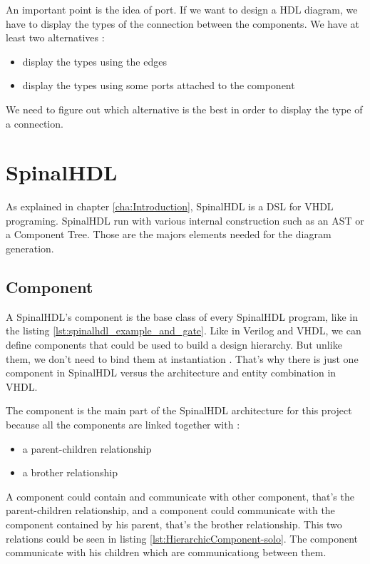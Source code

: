 An important point is the idea of port. If we want to design a HDL diagram, we
have to display the types of the connection between the components. We have at
least two alternatives :
\begin{itemize}
 \item display the types using the edges
 \item display the types using some ports attached to the component
\end{itemize}

We need to figure out which alternative is the best in order to display the type
of a connection.

\section{SpinalHDL}
\label{sec:SpinalHDL}

As explained in chapter \ref{cha:Introduction}, SpinalHDL is a DSL for VHDL
programing. SpinalHDL run with various internal construction such as an AST or
a Component Tree. Those are the majors elements needed for the diagram generation.

\subsection{Component}
\label{sub:Component}

A SpinalHDL's component is the base class of every SpinalHDL program, like in
the listing \ref{lst:spinalhdl_example_and_gate}. Like in Verilog and VHDL, we
can define components that could be used to build a design hierarchy. But unlike
them, we don’t need to bind them at instantiation \cite{github-spinalhdl}.
That's why there is just one component in SpinalHDL versus the architecture and entity
combination in VHDL.

The component is the main part of the SpinalHDL architecture for this project
because all the components are linked together with :
\begin{itemize}
    \item a parent-children relationship
    \item a brother relationship
\end{itemize}

A component could contain and communicate with other component, that's the
parent-children relationship, and a component could communicate with the
component contained by his parent, that's the brother relationship. This two
relations could be seen in listing \ref{lst:HierarchicComponent-solo}. The
component communicate with his children which are communicationg between
them.

